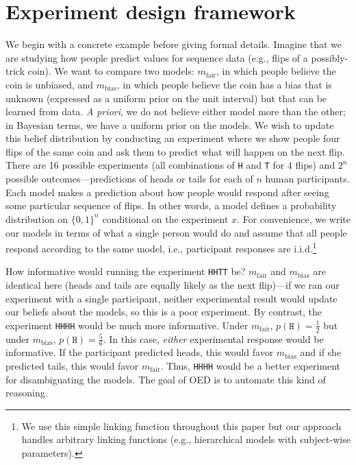 \documentclass[10pt,letterpaper]{article}
\begin{document}
\section{Experiment design framework}
\label{s:bayes}
We begin with a concrete example before giving formal details.
Imagine that we are studying how people predict values for sequence data (e.g., flips of a possibly-trick coin).
We want to compare two models: $m_{\text{fair}}$, in which people believe the coin is unbiased, and $m_{\text{bias}}$, in which people believe the coin has a bias that is unknown (expressed as a uniform prior on the unit interval) but that can be learned from data.
\emph{A priori}, we do not believe either model more than the other; in Bayesian terms, we have a uniform prior on the models.
We wish to update this belief distribution by conducting an experiment where we show people four flips of the same coin and ask them to predict what will happen on the next flip.
There are 16 possible experiments (all combinations of \lstinline{H} and \lstinline{T} for 4 flips) and $2^n$ possible outcomes---predictions of heads or tails for each of $n$ human participants.
Each model makes a prediction about how people would respond after seeing some particular sequence of flips.
In other words, a model defines a probability distribution on $\{0,1\}^n$ conditional on the experiment $x$.
For convenience, we write our models in terms of what a single person would do and assume that all people respond according to the same model, i.e., participant responses are i.i.d.\footnote{We use this simple linking function throughout this paper but our approach handles arbitrary linking functions (e.g., hierarchical models with subject-wise parameters).}

How informative would running the experiment \lstinline{HHTT} be?
$m_{\text{fair}}$ and $m_{\text{bias}}$ are identical here (heads and tails are equally likely as the next flip)---if we ran our experiment with a single participant, neither experimental result would update our beliefs about the models, so this is a poor experiment.
By contrast, the experiment \lstinline{HHHH} would be much more informative.
Under $m_{\text{fair}}$, $p(\texttt{H}) = \frac{1}{2}$ but under $m_{\text{bias}}$, $p(\texttt{H}) = \frac{5}{6}$.
In this case, \emph{either} experimental response would be informative.
If the participant predicted heads, this would favor $m_{\text{bias}}$ and if she predicted tails, this would favor $m_{\text{fair}}$.
Thus, \lstinline{HHHH} would be a better experiment for disambiguating the models.
The goal of OED is to automate this kind of reasoning.
\end{document}
